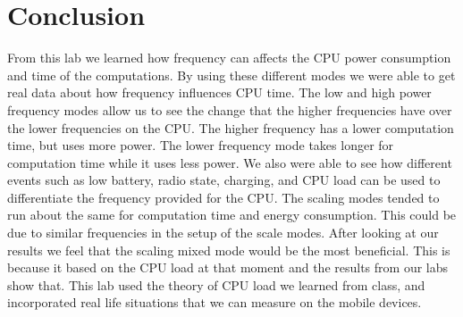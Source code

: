 \documentclass{article} %
\begin{document}
\section{Conclusion}
From this lab we learned how frequency can affects the CPU power consumption and time of the computations.  By using these different modes we were able to get real data about how frequency influences CPU time.  The low and high power frequency modes allow us to see the change that the higher frequencies have over the lower frequencies on the CPU.  The higher frequency has a lower computation time, but uses more power.  The lower frequency mode takes longer for computation time while it uses less power.  We also were able to see how different events such as low battery, radio state, charging, and CPU load can be used to differentiate the frequency provided for the CPU.  The scaling modes tended to run about the same for computation time and energy consumption.  This could be due to similar frequencies in the setup of the scale modes.  After looking at our results we feel that the scaling mixed mode would be the most beneficial.  This is because it based on the CPU load at that moment and the results from our labs show that.  This lab used the theory of CPU load we learned from class, and incorporated real life situations that we can measure on the mobile devices.  


\end{document}
